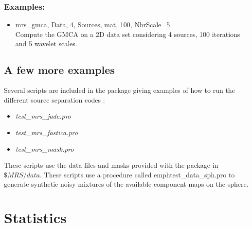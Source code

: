 \subsubsection*{Examples:} 
\begin{itemize}
\item mrs\_gmca, Data, 4, Sources, mat, 100, NbrScale=5 \\
Compute the GMCA on a 2D data set considering 4 sources, 100 iterations and 5 wavelet scales.
\end{itemize}



\subsection{A few more examples}

Several scripts are included in the package giving examples of how to run the different source separation codes : 
\begin{itemize}
\item{\emph{test\_mrs\_jade.pro}}
\item{\emph{test\_mrs\_fastica.pro}}
\item{\emph{test\_mrs\_mask.pro}}
\end{itemize}
These scripts use the data files and masks provided with the package in $\$MRS/data$. These scripts use a procedure 
called emph{test\_data\_sph.pro} to generate synthetic noisy mixtures of the available component maps on the sphere.



\section{Statistics}

